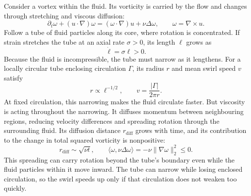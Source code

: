 Consider a vortex within the fluid. Its vorticity is carried by the flow
and changes through stretching and viscous diffusion:
\[
 \partial_t\omega+(u\cdot\nabla)\omega
 =(\omega\cdot\nabla)u+\nu\Delta\omega,
 \qquad \omega=\nabla\times u.
\]
Follow a tube of fluid particles along its core, where rotation is
concentrated. If strain stretches the tube at an axial rate \(\sigma>0\),
its length \(\ell\) grows as
\[
 \dot\ell=\sigma\ell>0.
\]
Because the fluid is incompressible, the tube must narrow as it lengthens.
For a locally circular tube enclosing circulation \(\Gamma\), its radius
\(r\) and mean swirl speed \(v\) satisfy
\[
 r\propto\ell^{-1/2},
 \qquad v=\frac{|\Gamma|}{2\pi r}.
\]
At fixed circulation, this narrowing makes the fluid circulate faster.
But viscosity is acting throughout the narrowing. It diffuses momentum
between neighbouring regions, reducing velocity differences and spreading
rotation through the surrounding fluid. Its diffusion distance
\(r_{\mathrm{diff}}\) grows with time, and its contribution to the change
in total squared vorticity is nonpositive:
\[
 r_{\mathrm{diff}}\sim\sqrt{\nu t},
 \qquad
 \langle\omega,\nu\Delta\omega\rangle
 =-\nu\|\nabla\omega\|_2^2\le0.
\]
This spreading can carry rotation beyond the tube's boundary even while
the fluid particles within it move inward. The tube can narrow while
losing enclosed circulation, so the swirl speeds up only if that circulation
does not weaken too quickly.
